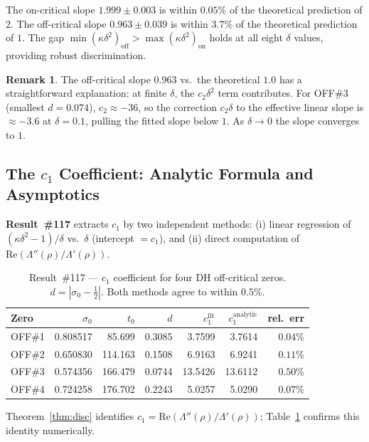 \documentclass[11pt, a4paper]{article}
\theoremstyle{plain}
\theoremstyle{definition}
\newtheorem{remark}{Remark}[section]
\begin{document}
The on-critical slope $1.999\pm0.003$ is within $0.05\%$ of the
theoretical prediction of $2$.  The off-critical slope $0.963\pm0.039$
is within $3.7\%$ of the theoretical prediction of $1$.  The gap
$\min(\kappa\delta^{2})_{\text{off}} > \max(\kappa\delta^{2})_{\text{on}}$
holds at all eight $\delta$ values, providing robust discrimination.

\begin{remark}
  The off-critical slope $0.963$ vs.\ the theoretical $1.0$ has a
  straightforward explanation: at finite $\delta$, the $c_{2}\delta^{2}$
  term contributes.  For OFF\#3 (smallest $d=0.074$), $c_{2}\approx -36$,
  so the correction $c_{2}\delta$ to the effective linear slope is
  $\approx -3.6$ at $\delta=0.1$, pulling the fitted slope below $1$.
  As $\delta\to 0$ the slope converges to $1$.
\end{remark}


\subsection{The $c_{1}$ Coefficient: Analytic Formula and Asymptotics}
\label{ssec:c1}

\textbf{Result~\#117} extracts $c_{1}$ by two independent methods:
(i) linear regression of $(\kappa\delta^{2}-1)/\delta$ vs.\ $\delta$
(intercept $= c_{1}$), and (ii) direct computation of
$\mathrm{Re}(\Lambda''(\rho)/\Lambda'(\rho))$.

\begin{table}[ht]
\centering
\caption{Result~\#117 — $c_{1}$ coefficient for four DH off-critical zeros.
  $d=|\sigma_{0}-\tfrac{1}{2}|$.  Both methods agree to within $0.5\%$.}
\label{tab:c1117}
\small
\begin{tabular}{lrrrrrr}
\toprule
Zero & $\sigma_{0}$ & $t_{0}$ & $d$ & $c_{1}^{\text{fit}}$
     & $c_{1}^{\text{analytic}}$ & rel.\ err \\
\midrule
OFF\#1 & 0.808517 & 85.699  & 0.3085 & 3.7599 & 3.7614 & $0.04\%$ \\
OFF\#2 & 0.650830 & 114.163 & 0.1508 & 6.9163 & 6.9241 & $0.11\%$ \\
OFF\#3 & 0.574356 & 166.479 & 0.0744 & 13.5426 & 13.6112 & $0.50\%$ \\
OFF\#4 & 0.724258 & 176.702 & 0.2243 & 5.0257 & 5.0290 & $0.07\%$ \\
\bottomrule
\end{tabular}
\end{table}

Theorem~\ref{thm:disc} identifies $c_{1}=\mathrm{Re}(\Lambda''(\rho)/\Lambda'(\rho))$;
Table~\ref{tab:c1117} confirms this identity numerically.
\end{document}
